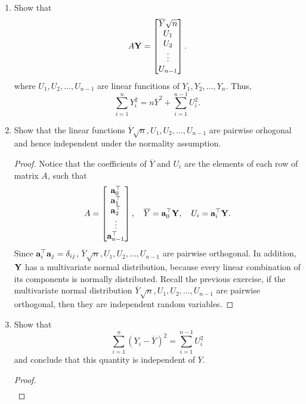 \documentclass[10pt]{article}
\begin{document}
	\begin{enumerate}
		\item Show that
		\begin{equation}
			A \vb{Y} =
			\begin{bmatrix}
				\overline{Y} \sqrt{n} \\
				U_1 \\
				U_2 \\
				\vdots \\
				U_{n-1}
			\end{bmatrix}.
		\end{equation}
		where $U_1, U_2, \dots, U_{n-1}$ are linear funcitions of $Y_1, Y_2, \dots, Y_n$. Thus,
		\begin{equation}
			\sum_{i=1}^n Y_i^2 = n \overline{Y}^2 + \sum_{i=1}^{n-1} U_i^2.
		\end{equation}
		\item Show that the linear functions $\overline{Y} \sqrt{n}, U_1, U_2, \dots, U_{n-1}$ are pairwise orhogonal and hence independent under the normality assumption.
		\begin{proof}
			Notice that the coefficients of $\overline{Y}$ and $U_i$ are the elements of each row of matrix $A$, such that
			\begin{gather}
				A = \bmqty{\vb{a}_0^{\top} \\ \vb{a}_1^{\top} \\ \vb{a}_2^{\top} \\ \vdots \\ \vb{a}_{n-1}^{\top}}\qc
				\overline{Y} = \vb{a}_0^{\top} \vb{Y}\qc
				U_i = \vb{a}_i^{\top} \vb{Y}.
			\end{gather}
			Since $\vb{a}_i^{\top} \vb{a}_j = \delta_{ij}$, $\overline{Y} \sqrt{n}, U_1, U_2, \dots, U_{n-1}$ are pairwise orthogonal. In addition, $\vb{Y}$ has a multivariate normal distribution, because every linear combination of its components is normally distributed. Recall the previous exercise, if the multivariate normal distribution $\overline{Y} \sqrt{n}, U_1, U_2, \dots, U_{n-1}$ are pairwise orthogonal, then they are independent random variables.
		\end{proof}
		\item Show that
		\begin{equation}
			\sum_{i=1}^n (Y_i - \overline{Y})^2 = \sum_{i=1}^{n-1} U_i^2
		\end{equation}
		and conclude that this quantity is independent of $\overline{Y}$.
		\begin{proof}
			\begin{align*}

\end{align*}
\end{proof}
\end{enumerate}
\end{document}
